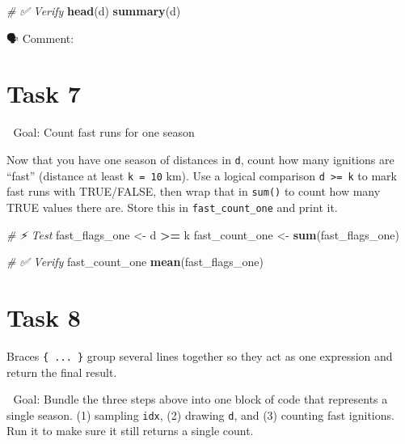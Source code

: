 \documentclass[
  12pt,
]{scrreprt}
\newenvironment{Shaded}{\begin{snugshade}}{\end{snugshade}}
\newcommand{\CommentTok}[1]{\textcolor[rgb]{0.56,0.35,0.01}{\textit{#1}}}
\newcommand{\FunctionTok}[1]{\textcolor[rgb]{0.13,0.29,0.53}{\textbf{#1}}}
\newcommand{\NormalTok}[1]{#1}
\newcommand{\OtherTok}[1]{\textcolor[rgb]{0.56,0.35,0.01}{#1}}
\newcommand{\SpecialCharTok}[1]{\textcolor[rgb]{0.81,0.36,0.00}{\textbf{#1}}}
\begin{document}
\begin{Shaded}
\begin{Highlighting}[]
\CommentTok{\# ✅  Verify}
\FunctionTok{head}\NormalTok{(d)}
\FunctionTok{summary}\NormalTok{(d)}
\end{Highlighting}
\end{Shaded}

🗣 Comment:

\section{Task 7}\label{task-7}

🎯 Goal: Count fast runs for one season

Now that you have one season of distances in \texttt{d}, count how many ignitions are ``fast'' (distance at least \texttt{k\ =\ 10} km). Use a logical comparison \texttt{d\ \textgreater{}=\ k} to mark fast runs with TRUE/FALSE, then wrap that in \texttt{sum()} to count how many TRUE values there are. Store this in \texttt{fast\_count\_one} and print it.

\begin{Shaded}
\begin{Highlighting}[]
\CommentTok{\# ⚡ Test}
\NormalTok{fast\_flags\_one  }\OtherTok{\textless{}{-}}\NormalTok{ d }\SpecialCharTok{\textgreater{}=}\NormalTok{ k}
\NormalTok{fast\_count\_one  }\OtherTok{\textless{}{-}} \FunctionTok{sum}\NormalTok{(fast\_flags\_one)}
\end{Highlighting}
\end{Shaded}

\begin{Shaded}
\begin{Highlighting}[]
\CommentTok{\# ✅  Verify}
\NormalTok{fast\_count\_one}
\FunctionTok{mean}\NormalTok{(fast\_flags\_one)}
\end{Highlighting}
\end{Shaded}

\section{Task 8}\label{task-8}

Braces \texttt{\{\ ...\ \}} group several lines together so they act as one expression and return the final result.

🎯 Goal: Bundle the three steps above into one block of code that represents a single season. (1) sampling \texttt{idx}, (2) drawing \texttt{d}, and (3) counting fast ignitions.
Run it to make sure it still returns a single count.
\end{document}
